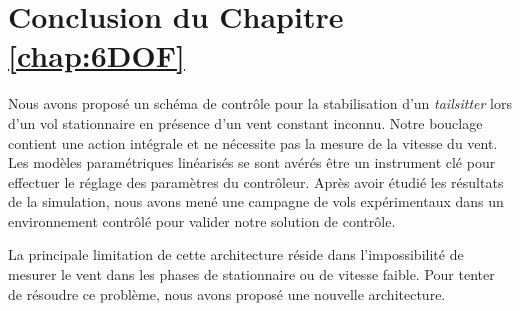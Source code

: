 \section{Conclusion du Chapitre \ref{chap:6DOF}}
Nous avons proposé un schéma de contrôle pour la stabilisation d'un \textit{tailsitter} lors d'un vol stationnaire en présence d'un vent constant inconnu. Notre bouclage contient une action intégrale et ne nécessite pas la mesure de la vitesse du vent. Les modèles paramétriques linéarisés se sont avérés être un instrument clé pour effectuer le réglage des paramètres du contrôleur.
Après avoir étudié les résultats de la simulation, nous avons mené une campagne de vols expérimentaux dans un environnement contrôlé pour valider notre solution de contrôle. 

La principale limitation de cette architecture réside dans l'impossibilité de mesurer le vent dans les phases de stationnaire ou de vitesse faible. Pour tenter de résoudre ce problème, nous avons proposé une nouvelle architecture.


